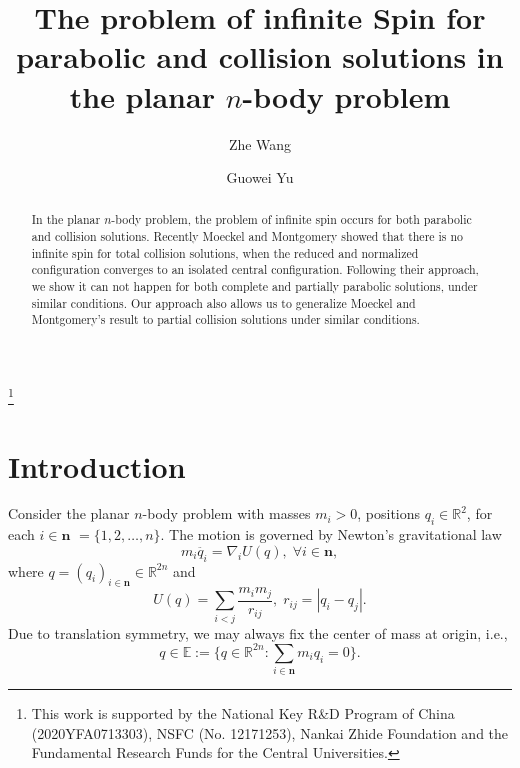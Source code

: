 \documentclass[11pt]{amsart}
\theoremstyle{definition}
\theoremstyle{remark}
\numberwithin{equation}{section}
\newcommand{\rr}{\mathbb R}
\newcommand{\be}{\mathbb E}
\newcommand{\bn}{\mathbf n}
\begin{document}
\title[infinite spin]{The problem of infinite Spin for parabolic and collision solutions in the planar $n$-body problem}
 


\author{Zhe Wang}
\address{Chern Institute of Mathematics and LPMC, Nankai University, Tianjin, China}

\author{Guowei Yu}
\address{Chern Institute of Mathematics and LPMC, Nankai University, Tianjin, China}
 


\thanks{This work is supported by the National Key R\&D Program of China (2020YFA0713303), NSFC (No. 12171253), Nankai Zhide Foundation and the Fundamental Research Funds for the Central Universities.}


\begin{abstract} 
In the planar $n$-body problem, the problem of infinite spin occurs for both parabolic and collision solutions. Recently Moeckel and Montgomery \cite{MM25} showed that there is no infinite spin for total collision solutions, when the reduced and normalized configuration converges to an isolated central configuration. Following their approach, we show it can not happen for both complete and partially parabolic solutions, under similar conditions. Our approach also allows us to generalize Moeckel and Montgomery's result to partial collision solutions under similar conditions. 

\end{abstract}



\maketitle


\section{Introduction}
Consider the planar $n$-body problem with masses $m_i>0$, positions $q_i\in\mathbb{R}^2$, for each $i \in \bn$ $=\{1, 2, \dots, n\}$. The motion is governed by Newton's gravitational law
\begin{equation} \label{eq;n-body}
 m_i\ddot{q_i}=\nabla_iU(q), \; \forall i \in \bn,
\end{equation}
where $q=(q_i)_{i \in \bn} \in\mathbb{R}^{2n}$ and
$$  U(q)=\underset{i<j}{\sum}\frac{m_im_j}{r_{ij}}, \; r_{ij}=|q_i-q_j|. $$
Due to translation symmetry, we may always fix the center of mass at origin, i.e., 
$$ q \in \be :=\{ q \in \rr^{2n}: \sum_{i \in \bn} m_i q_i =0\}. $$
\end{document}
